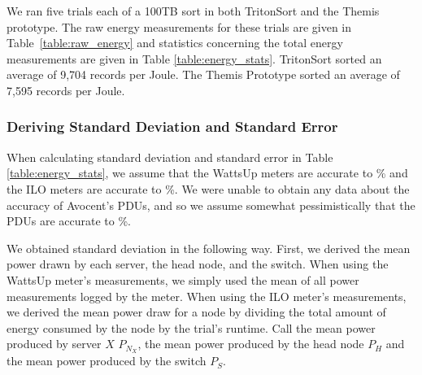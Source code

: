 \begin{table}
\centering
\caption{\label{table:energy_stats} Statistics for the energy measurements
  presented in Table~\ref{table:raw_energy}.}
\end{table}

We ran five trials each of a 100TB sort in both TritonSort and the Themis
prototype. The raw energy measurements for these trials are given in
Table~\ref{table:raw_energy} and statistics concerning the total energy
measurements are given in Table \ref{table:energy_stats}. TritonSort sorted an
average of 9,704 records per Joule. The Themis Prototype sorted an average of
7,595 records per Joule.


\subsubsection{Deriving Standard Deviation and Standard Error}

When calculating standard deviation and standard error in Table
\ref{table:energy_stats}, we assume that the WattsUp meters are accurate to
\% and the ILO meters are accurate to \%. We were unable to
obtain any data about the accuracy of Avocent's PDUs, and so we assume somewhat
pessimistically that the PDUs are accurate to \%.

We obtained standard deviation in the following way. First, we derived the mean
power drawn by each server, the head node, and the switch. When using the
WattsUp meter's measurements, we simply used the mean of all power measurements
logged by the meter. When using the ILO meter's measurements, we derived the
mean power draw for a node by dividing the total amount of energy consumed by
the node by the trial's runtime. Call the mean power produced by server $X$
$P_{N_X}$, the mean power produced by the head node $P_H$ and the mean power
produced by the switch $P_S$.

